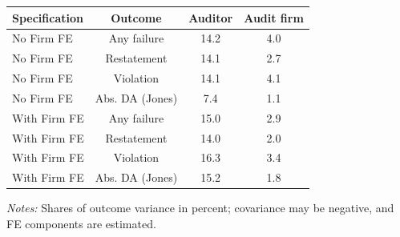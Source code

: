 \documentclass[10pt]{article}
\begin{document}
\begin{minipage}{19cm}\fontsize{10}{12}\selectfont\setlength{\tabcolsep}{4pt}\renewcommand{\arraystretch}{1.12}


\centering
{}
\begin{threeparttable}
\begin{tabular}{p{}ccc}
\toprule
Specification & Outcome & Auditor & Audit firm \\
\midrule
No Firm FE & Any failure & 14.2 & 4.0 \\
No Firm FE & Restatement & 14.1 & 2.7 \\
No Firm FE & Violation & 14.1 & 4.1 \\
No Firm FE & Abs. DA (Jones) & 7.4 & 1.1 \\
With Firm FE & Any failure & 15.0 & 2.9 \\
With Firm FE & Restatement & 14.0 & 2.0 \\
With Firm FE & Violation & 16.3 & 3.4 \\
With Firm FE & Abs. DA (Jones) & 15.2 & 1.8 \\
\bottomrule
\end{tabular}
\begin{tablenotes}\fontsize{9}{11}\selectfont
\item \raggedright \fontsize{9}{11}\selectfont \textit{Notes:} Shares of outcome variance in percent; covariance may be negative, and FE components are estimated.
\end{tablenotes}
\end{threeparttable}

\end{minipage}
\end{document}
